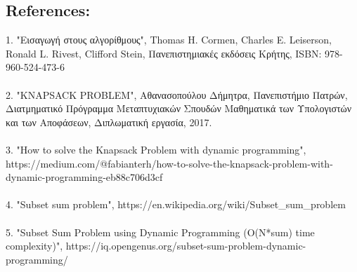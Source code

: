 \documentclass[12pt]{article}
\begin{document}
\vspace{2in}

\pagebreak

\subsection*{References:}

1. "Εισαγωγή στους αλγορίθμους", Thomas H. Cormen, Charles E. Leiserson, Ronald L. Rivest, Clifford Stein, Πανεπιστημιακές εκδόσεις Κρήτης, ISBN: 978-960-524-473-6 \\ \\

2. "KNAPSACK PROBLEM", Αθανασοπούλου Δήμητρα, Πανεπιστήμιο Πατρών, Διατμηματικό Πρόγραμμα Μεταπτυχιακών Σπουδών Μαθηματικά των Υπολογιστών και των Αποφάσεων, Διπλωματική εργασία, 2017. \\ \\

3. "How to solve the Knapsack Problem with dynamic programming",  https://medium.com/@fabianterh/how-to-solve-the-knapsack-problem-with-dynamic-programming-eb88c706d3cf \\ \\

4. "Subset sum problem", https://en.wikipedia.org/wiki/Subset\_sum\_problem \\ \\ 

5. "Subset Sum Problem using Dynamic Programming (O(N*sum) time complexity)", https://iq.opengenus.org/subset-sum-problem-dynamic-programming/ \\ \\
\end{document}
